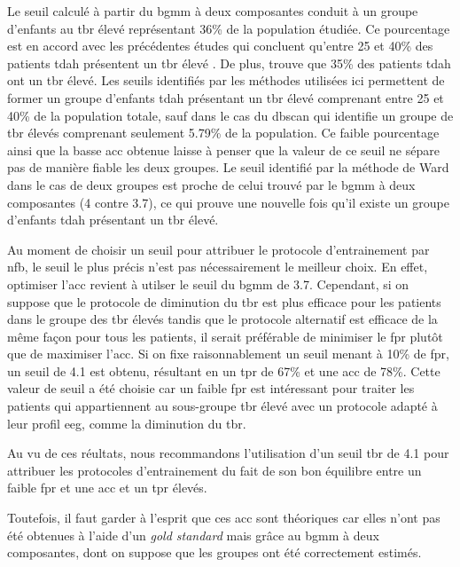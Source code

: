 Le seuil calculé à partir du \gls{bgmm} à deux composantes conduit à un groupe d'enfants au \gls{tbr} élevé représentant 36\% de la population étudiée. 
Ce pourcentage est en accord avec les précédentes études qui concluent qu'entre 25 et 40\% des patients \gls{tdah} présentent un \gls{tbr} élevé \citep{Arns2012}. 
De plus,\citep{Clarke2011} trouve que 35\% des patients \gls{tdah} ont un \gls{tbr} élevé. 
Les seuils identifiés par les méthodes utilisées ici permettent de former un groupe d'enfants \gls{tdah} présentant un \gls{tbr} élevé comprenant entre
25 et 40\% de la population totale, sauf dans le cas du \gls{dbscan} qui identifie un groupe
de \gls{tbr} élevés comprenant seulement 5.79\% de la population. Ce faible pourcentage ainsi que la basse \gls{acc} obtenue laisse à penser
que la valeur de ce seuil ne sépare pas de manière fiable les deux groupes. Le seuil identifié par la méthode de Ward dans le cas de deux groupes
est proche de celui trouvé par le \gls{bgmm} à deux composantes (4 contre 3.7), ce qui prouve une nouvelle fois qu'il existe un groupe d'enfants \gls{tdah}
présentant un \gls{tbr} élevé.

Au moment de choisir un seuil pour attribuer le protocole d'entrainement par \gls{nfb}, le seuil le plus précis n'est pas nécessairement le meilleur choix.
En effet, optimiser l'\gls{acc} revient à utilser le seuil du \gls{bgmm} de 3.7. Cependant, si on suppose que le protocole de diminution du \gls{tbr} est plus 
efficace pour les patients dans le groupe des \gls{tbr} élevés tandis que le protocole alternatif est efficace de la même façon pour tous les patients, il 
serait préférable de minimiser le \gls{fpr} plutôt que de maximiser l'\gls{acc}. Si on fixe raisonnablement un seuil menant à 10\% de \gls{fpr}, un seuil de 4.1
est obtenu, résultant en un \gls{tpr} de 67\% et une \gls{acc} de 78\%. Cette valeur de seuil a été choisie car un faible \gls{fpr} est intéressant pour traiter 
les patients qui appartiennent au sous-groupe \gls{tbr} élevé avec un protocole adapté à leur profil \gls{eeg}, comme la diminution du \gls{tbr}.

Au vu de ces réultats, nous recommandons l'utilisation d'un seuil \gls{tbr} de 4.1 pour attribuer
les protocoles d'entrainement du fait de son bon équilibre entre un faible \gls{fpr} et une \gls{acc} et un \gls{tpr} élevés. 

Toutefois, il faut garder à l'esprit que ces \gls{acc} sont théoriques car elles n'ont pas été obtenues à l'aide d'un \textit{gold standard} mais grâce au \gls{bgmm}
à deux composantes, dont on suppose que les groupes ont été correctement estimés. 

